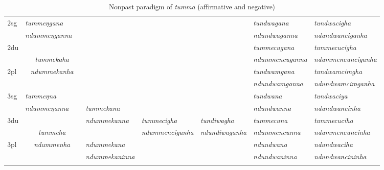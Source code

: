 \begin{landscape}
\begin{table}[p]
{{\begin{tabular}{|l||p{2.4cm}|p{2.0cm}|p{2.6cm}|p{2.8cm}|p{2.6cm}|p{3.2cm}|p{3.2cm}|}
\hline				
{\sc 2sg} 		&	\emph{tummeŋgana}  &	    & \multicolumn{3}{c|}{ \cellcolor[gray]{.8}}& \emph{tundwagana}  &   \emph{tundwacigha}\\
		&  \emph{ndummeŋganna} &  & \multicolumn{3}{c|}{ \cellcolor[gray]{.8}}&\emph{ ndundwaganna} &\emph{ndundwanciganha}  \\
 \cline{1-2} \cline{7-8}			
{\sc 2du}		&	\multicolumn{2}{c|}{}     & \multicolumn{3}{c|}{\cellcolor[gray]{.8}} & \emph{tummecugana}  &  \emph{tummecucigha} \\
		&  	\multicolumn{2}{c|}{\emph{tummekaha}} & \multicolumn{3}{c|}{\cellcolor[gray]{.8} }&\emph{ndummencuganna}  & \emph{ndummencunciganha} \\
 \cline{1-1} \cline{7-8}			
{\sc 2pl}		&	\multicolumn{2}{c|}{\emph{ndummekanha}} & \multicolumn{3}{c|}{ \cellcolor[gray]{.8}}& \emph{tundwamgana}& \emph{tundwamcimgha}  \\
		&	\multicolumn{2}{c|}{ }& \multicolumn{3}{c|}{\cellcolor[gray]{.8}}&\emph{ ndundwamganna} & \emph{ndundwamcimganha} \\
\hline			
{\sc 3sg} 		&\emph{tummeŋna}	  &	      	&  			&    &    	&\emph{tundwana}&\emph{tundwaciya}\\
		& \emph{ndummeŋanna}   &   	& \emph{tummekana}	&  &   &\emph{ndundwanna}&\emph{ndundwancinha}\\
  \cline{1-2}  \cline{7-8}					
{\sc 3du}& \multicolumn{2}{c|}{}&\emph{ndummekanna}& \emph{tummecigha}&\emph{tundiwagha}&  \emph{tummecuna} & \emph{ tummecuciha}\\
	& \multicolumn{2}{c|}{\emph{tummeha}}& &\emph{ndummenciganha}& \emph{ndundiwaganha} & \emph{ndummencunna} & \emph{ndummencuncinha}\\
 \cline{1-1} \cline{4-4} \cline{7-8}	
{\sc 3pl}&\multicolumn{2}{c|}{\emph{ndummenha}}	&\emph{ndummekana}& & &\emph{ndundwana}&\emph{ndundwaciha}\\	
	&\multicolumn{2}{c|}{ }&\emph{ndummekaninna}&& &\emph{ndundwaninna}&\emph{ndundwancininha} \\
\lspbottomrule
\end{tabular}
}
}
\caption{Nonpast paradigm of \emph{tumma}  (affirmative and negative)}\label{par-tund-npst}
\end{table}




\end{landscape}
